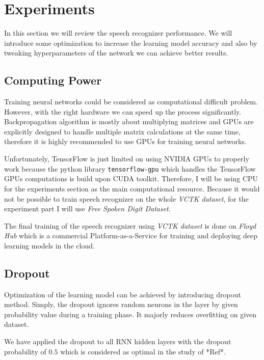 \chapter{Experiments}

In this section we will review the speech recognizer performance.
We will introduce some optimization to increase the learning model accuracy and also by tweaking hyperparameters of the network we can achieve better results.

\section{Computing Power}

Training neural networks could be considered as computational difficult problem.
However, with the right hardware we can speed up the process significantly.
Backpropagation algorithm is mostly about multiplying matrices and GPUs are explicitly designed to handle multiple matrix calculations at the same time, therefore it is highly recommended to use GPUs for training neural networks.

Unfortunately, TensorFlow is just limited on using NVIDIA GPUs to properly work because the python library \texttt{tensorflow-gpu} which handles the TensorFlow GPUs computations is build upon CUDA toolkit.
Therefore, I will be using CPU for the experiments section as the main computational resource.
Because it would not be possible to train speech recognizer on the whole \textit{VCTK dataset}, for the experiment part I will use \textit{Free Spoken Digit Dataset}.

The final training of the speech recognizer using \textit{VCTK dataset} is done on \textit{Floyd Hub} which is a commercial Platform-as-a-Service for training and deploying deep learning models in the cloud.

\section{Dropout}

Optimization of the learning model can be achieved by introducing dropout method.
Simply, the dropout ignores random neurons in the layer by given probability value during a training phase.
It majorly reduces overfitting on given dataset.

We have applied the dropout to all RNN hidden layers with the dropout probability of $0.5$ which is considered as optimal in the study of *Ref*.

